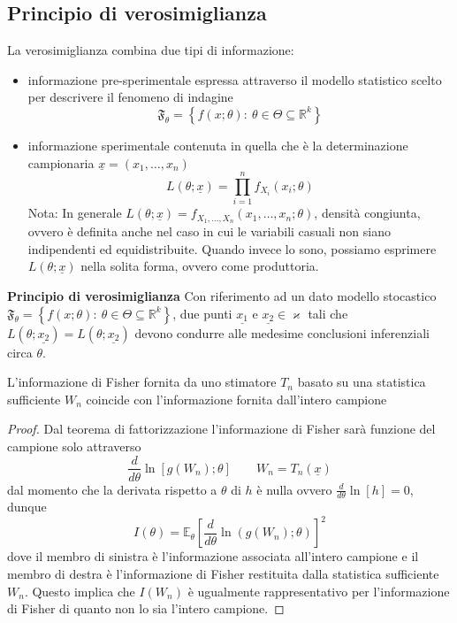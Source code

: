 \subsection{Principio di verosimiglianza}
La verosimiglianza combina due tipi di informazione:
\begin{itemize}
\item informazione pre-sperimentale espressa attraverso il modello statistico scelto per descrivere il fenomeno di indagine
$$\mathfrak{F}_\theta=\left\{f(x;\theta):\ \theta\in\Theta\subseteq\mathbb{R}^k\right\}$$
\item informazione sperimentale contenuta in quella che è la determinazione campionaria $\underline{x}=(x_1,\ldots, x_n)$
$$L(\theta;\underline{x})=\prod_{i=1}^n f_{X_i}(x_i;\theta)$$
Nota: In generale $L(\theta;\underline{x})=f_{X_1,\ldots, X_n}(x_1,\ldots, x_n;\theta)$, densità congiunta, ovvero è definita anche nel caso in cui le variabili casuali non siano indipendenti ed equidistribuite. Quando invece lo sono, possiamo esprimere $L(\theta; \underline{x})$ nella solita forma, ovvero come produttoria.
\end{itemize}

\noindent\textbf{Principio di verosimiglianza} Con riferimento ad un dato modello stocastico $\mathfrak{F}_\theta=\left\{f(x;\theta):\ \theta\in\Theta\subseteq\mathbb{R}^k\right\}$, due punti $\underline{x_1}$ e $\underline{x_2}\in\varkappa$ tali che $L(\theta;\underline{x_2})=L(\theta;\underline{x_2})$ devono condurre alle medesime conclusioni inferenziali circa $\theta$.

\begin{teo}
L'informazione di Fisher fornita da uno stimatore $T_n$ basato su una statistica sufficiente $W_n$ coincide con l'informazione fornita dall'intero campione

\begin{proof}
Dal teorema di fattorizzazione l'informazione di Fisher sarà funzione del campione solo attraverso
$$\frac{d}{d\theta}\ln\left[g(W_n);\theta\right]\qquad W_n=T_n(\underline{x})$$
dal momento che la derivata rispetto a $\theta$ di $h$ è nulla ovvero $\frac{d}{d\theta}\ln\left[h\right]=0$, dunque
$$I(\theta)=\mathbb{E}_\theta\left[\frac{d}{d\theta}\ln(g(W_n);\theta)\right]^2$$
dove il membro di sinistra è l'informazione associata all'intero campione e il membro di destra è l'informazione di Fisher restituita dalla statistica sufficiente $W_n$.
Questo implica che $I(W_n)$ è ugualmente rappresentativo per l'informazione di Fisher di quanto non lo sia l'intero campione.
\end{proof}
\end{teo}



